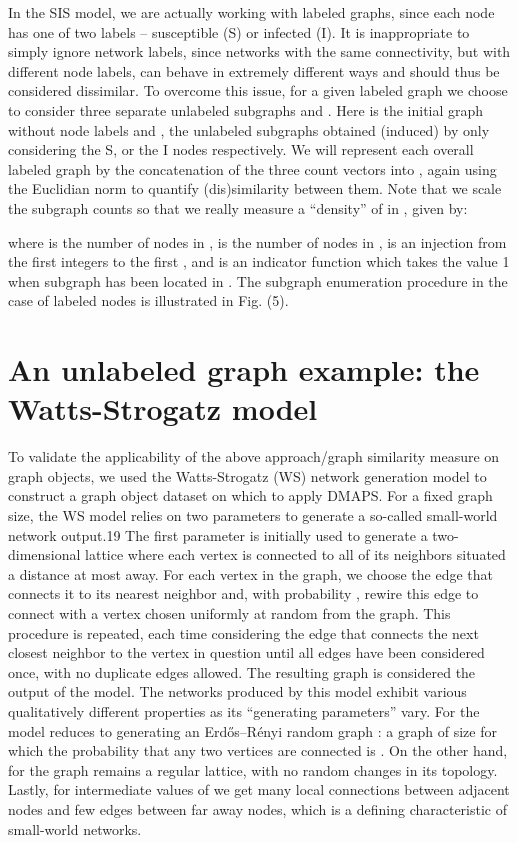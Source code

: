 In the SIS model, we are actually working with labeled graphs, since each node has one of two labels – susceptible (S) or infected (I). It is inappropriate to simply ignore network labels, since networks with the same connectivity, but with different node labels, can behave in extremely different ways and should thus be considered dissimilar. To overcome this issue, for a given labeled graph  we choose to consider three separate unlabeled subgraphs  and . Here  is the initial graph  without node labels and ,  the unlabeled subgraphs obtained (induced) by only considering the S, or the I nodes respectively. We will represent each overall labeled graph by the concatenation of the three count vectors  into , again using the Euclidian norm to quantify (dis)similarity between them. Note that we scale the subgraph counts so that we really measure a “density” of  in , given by:

where is the number of nodes in , is the number of nodes in , is an
injection from the first integers to the first , and is an indicator
function which takes the value 1 when subgraph has been located in
. The subgraph enumeration procedure in the case of labeled nodes is
illustrated in Fig. (5).

\section{An unlabeled graph example: the Watts-Strogatz model}

To validate the applicability of the above approach/graph similarity
measure on graph objects, we used the Watts-Strogatz (WS) network
generation model to construct a graph object dataset on which to apply
DMAPS. For a fixed graph size, the WS model relies on two parameters
to generate a so-called small-world network output.19 The first
parameter is initially used to generate a two-dimensional lattice
where each vertex is connected to all of its neighbors situated a
distance at most away. For each vertex in the graph, we choose the
edge that connects it to its nearest neighbor and, with probability ,
rewire this edge to connect with a vertex chosen uniformly at random
from the graph. This procedure is repeated, each time considering the
edge that connects the next closest neighbor to the vertex in question
until all edges have been considered once, with no duplicate edges
allowed. The resulting graph is considered the output of the
model. The networks produced by this model exhibit various
qualitatively different properties as its “generating parameters”
vary. For the model reduces to generating an Erdős–Rényi random graph
: a graph of size for which the probability that any two vertices are
connected is . On the other hand, for the graph remains a regular
lattice, with no random changes in its topology. Lastly, for
intermediate values of we get many local connections between adjacent
nodes and few edges between far away nodes, which is a defining
characteristic of small-world networks.

